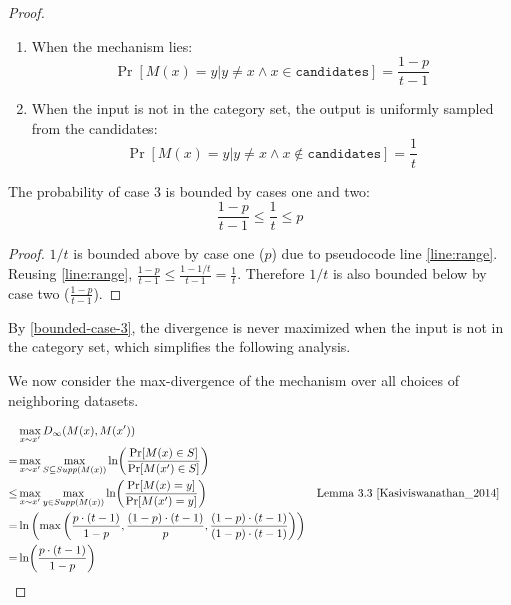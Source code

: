 \documentclass{article}
\begin{document}
\begin{proof}
\begin{enumerate}
    \item When the mechanism lies:  
    \[ 
        \Pr[M(x) = y | y \ne x \wedge x \in \texttt{candidates}] = \frac{1 - p}{t - 1} 
    \] 
 
    \item When the input is not in the category set, the output is uniformly sampled from the candidates:  
    \[ 
        \Pr[M(x) = y | y \ne x \wedge x \not\in \texttt{candidates}] = \frac{1}{t} 
    \] 
\end{enumerate} 
 
\begin{tcolorbox} 
\begin{lemma} 
    \label{bounded-case-3} 
    The probability of case 3 is bounded by cases one and two: 
     \begin{equation} 
        \frac{1 - p}{t - 1} \leq \frac{1}{t} \leq p 
     \end{equation} 
\end{lemma} 
 
\begin{proof} 
$1 / t$ is bounded above by case one ($p$) due to pseudocode line \ref{line:range}.  
Reusing \ref{line:range}, $\frac{1 - p}{t - 1} \leq \frac{1 - 1/t}{t - 1} = \frac{1}{t}$. 
Therefore $1 / t$ is also bounded below by case two ($\frac{1 - p}{t - 1}$). 
\end{proof} 
\end{tcolorbox} 
 
By \ref{bounded-case-3}, the divergence is never maximized when the input is not in the category set, 
which simplifies the following analysis. 
 
We now consider the max-divergence of the mechanism over all choices of neighboring datasets. 
     
\begin{align} 
    &\max_{x \sim x'} D_{\infty}(M(x), M(x')) \\ 
    =& \max_{x \sim x'} \max_{S \subseteq Supp(M(x))}\ln (\frac{\Pr[M(x) \in S]}{\Pr[M(x') \in S]}) \\ 
    \le& \max_{x \sim x'} \max_{y \in Supp(M(x))}\ln (\frac{\Pr[M(x) = y]}{\Pr[M(x') = y]}) &&\text{Lemma 3.3 } \cite{Kasiviswanathan_2014} \\ 
    =& \ln \left(\max\left(\frac{p \cdot (t - 1)}{1 - p}, \frac{(1 - p) \cdot (t - 1)}{p}, \frac{(1 - p) \cdot (t - 1)}{(1 - p) \cdot (t - 1)}\right)\right) \label{max-terms} \\ 
    =& \ln (\frac{p \cdot (t - 1)}{1 - p}) 
\end{align} 
 

\end{proof}
\end{document}
